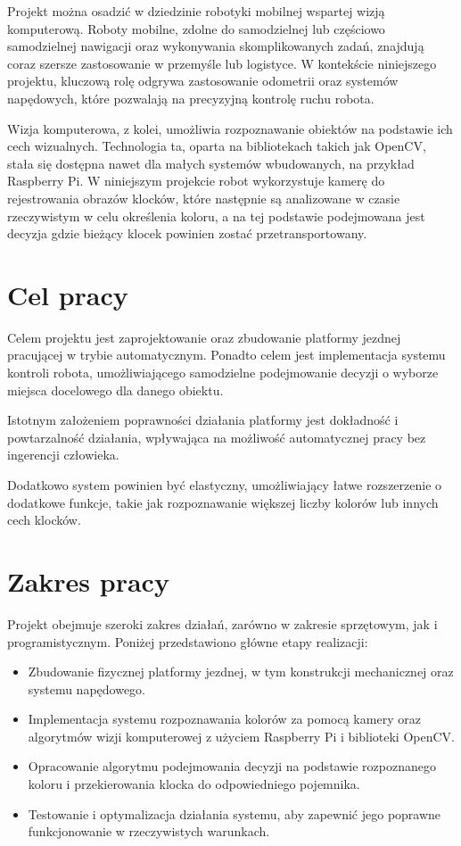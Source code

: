 Projekt można osadzić w dziedzinie robotyki mobilnej wspartej wizją komputerową. Roboty mobilne, zdolne do samodzielnej lub częściowo samodzielnej nawigacji oraz wykonywania skomplikowanych zadań, znajdują coraz szersze zastosowanie w przemyśle lub logistyce. W kontekście niniejszego projektu, kluczową rolę odgrywa zastosowanie odometrii oraz systemów napędowych, które pozwalają na precyzyjną kontrolę ruchu robota.

Wizja komputerowa, z kolei, umożliwia rozpoznawanie obiektów na podstawie ich cech wizualnych. Technologia ta, oparta na bibliotekach takich jak OpenCV, stała się dostępna nawet dla małych systemów wbudowanych, na przykład Raspberry Pi. W niniejszym projekcie robot wykorzystuje kamerę do rejestrowania obrazów klocków, które następnie są analizowane w czasie rzeczywistym w celu określenia koloru, a na tej podstawie podejmowana jest decyzja gdzie bieżący klocek powinien zostać przetransportowany.

\section{Cel pracy}
\label{sec:cel}

Celem projektu jest zaprojektowanie oraz zbudowanie platformy jezdnej pracującej w trybie automatycznym. Ponadto celem jest implementacja systemu kontroli robota, umożliwiającego samodzielne podejmowanie decyzji o wyborze miejsca docelowego dla danego obiektu.

Istotnym założeniem poprawności działania platformy jest dokładność i powtarzalność działania, wpływająca na możliwość automatycznej pracy bez ingerencji człowieka.

Dodatkowo system powinien być elastyczny, umożliwiający łatwe rozszerzenie o dodatkowe funkcje, takie jak rozpoznawanie większej liczby kolorów lub innych cech klocków.


\section{Zakres pracy}
\label{sec:zakres}

Projekt obejmuje szeroki zakres działań, zarówno w zakresie sprzętowym, jak i programistycznym. Poniżej przedstawiono główne etapy realizacji:

\begin{itemize}
    \item Zbudowanie fizycznej platformy jezdnej, w tym konstrukcji mechanicznej oraz systemu napędowego.
    \item Implementacja systemu rozpoznawania kolorów za pomocą kamery oraz algorytmów wizji komputerowej z użyciem Raspberry Pi i biblioteki OpenCV.
    \item Opracowanie algorytmu podejmowania decyzji na podstawie rozpoznanego koloru i przekierowania klocka do odpowiedniego pojemnika.
    \item Testowanie i optymalizacja działania systemu, aby zapewnić jego poprawne funkcjonowanie w rzeczywistych warunkach.
\end{itemize}

